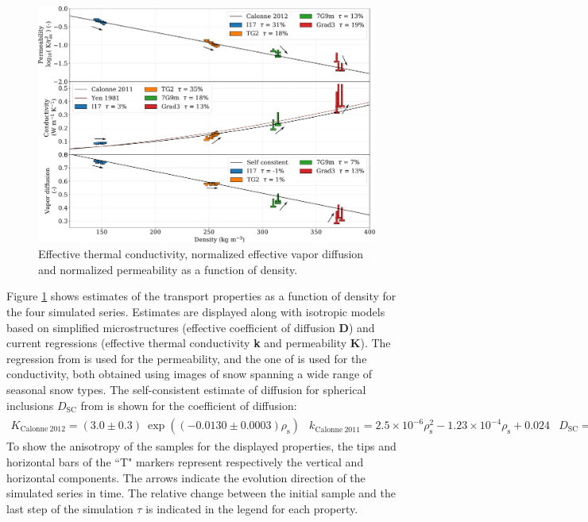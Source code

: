 \documentclass[draft,ms]{agujournal2019}
\begin{document}
\begin{figure}
    \centering
    \includegraphics[width=\linewidth]{Figures/tplot_all_arrows.pdf}
    \caption{Effective thermal conductivity, normalized effective vapor diffusion and normalized permeability as a function of density.}
    \label{fig:Tplot}
\end{figure}

Figure \ref{fig:Tplot} shows estimates of the transport properties as a function of density for the four simulated series. Estimates are displayed along with isotropic models based on simplified microstructures (effective coefficient of diffusion \textbf{D}) and current regressions (effective thermal conductivity \textbf{k} and permeability \textbf{K}). The regression from  is used for the permeability, and the one of   is used for the conductivity, both obtained using images of snow spanning a wide range of seasonal snow types. The self-consistent estimate of diffusion for spherical inclusions $D_{\mathrm{SC}}$ from  is shown for the coefficient of diffusion: \\
\begin{subequations}
\begin{align}
K_{\mathrm{Calonne\ 2012}}=(3.0 \pm 0.3)\ \exp \left(\left(-0.0130 \pm 0.0003\right) \rho_{\mathrm{s}}\right)
\end{align}
\begin{align}
k_{\mathrm{Calonne\ 2011}}=2.5 \times 10^{-6} \rho_{\mathrm{s}}^{2}-1.23 \times 10^{-4} \rho_{\mathrm{s}}+0.024\end{align}
\begin{align}
D_{\mathrm{SC}} = 1 - \frac{3\rho_s}{2\rho_i}
\end{align}
\end{subequations}
%
 To show the anisotropy of the samples for the displayed properties, the tips and horizontal bars of the ``T" markers represent respectively the vertical and horizontal components. The arrows indicate the evolution direction of the simulated series in time. The relative change between the initial sample and the last step of the simulation $\tau$ is indicated in the legend for each property.
\end{document}
